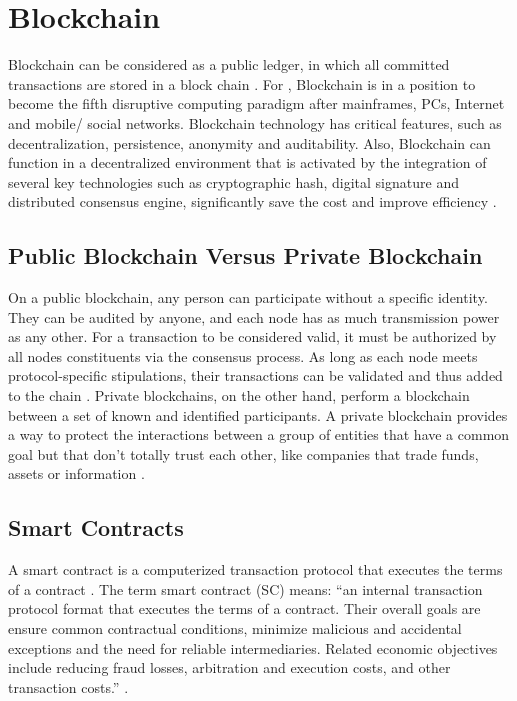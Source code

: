 \section{Blockchain} \label{sec:Theoretical}

Blockchain can be considered as a public ledger, in which all committed transactions are stored in a block chain \cite{zheng2016blockchain}. For \cite{swan2015blockchain}, Blockchain is in a position to become the fifth disruptive computing paradigm after mainframes, PCs, Internet and mobile/ social networks. Blockchain technology has critical features, such as decentralization, persistence, anonymity and auditability. Also, Blockchain can function in a decentralized environment that is activated by the integration of several key technologies such as cryptographic hash, digital signature and distributed consensus engine, significantly save the cost and improve efficiency \cite{zheng2016blockchain}.

\subsection{Public Blockchain Versus Private Blockchain}\label{sec:versus}
On a public blockchain, any person can participate without a specific identity. They can be audited by anyone, and each node has as much transmission power as any other. For a transaction to be considered valid, it must be authorized by all nodes constituents via the consensus process. As long as each node meets protocol-specific stipulations, their transactions can be validated and thus added to the chain \cite{greve2018blockchain}. Private blockchains, on the other hand, perform a blockchain between a set of known and identified participants. A private blockchain provides a way to protect the interactions between a group of entities that have a common goal but that don't totally trust each other, like companies that trade funds, assets or information \cite{swan2015blockchain}.

\subsection{Smart Contracts}\label{sec:smartContracts}
A smart contract is a computerized transaction protocol that executes the terms of a contract \cite{szabo1997idea}. The term smart contract (SC) means: “an internal transaction protocol format that executes the terms of a contract. Their overall goals are ensure common contractual conditions, minimize malicious and accidental exceptions and the need for reliable intermediaries. Related economic objectives include reducing fraud losses, arbitration and execution costs, and other transaction costs.” \cite{szabo1997idea}.

